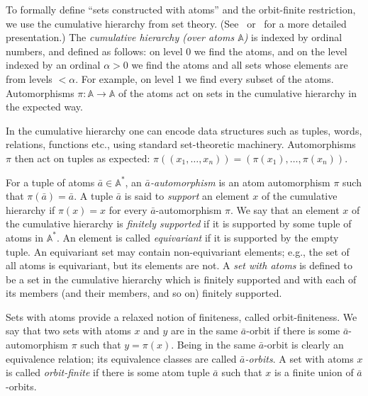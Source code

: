 \documentclass[10pt,a4paper]{amsart}
\numberwithin{equation}{section}
\newcommand{\atoms}{\mathbb A}
\begin{document}
 To formally define ``sets constructed with atoms'' and the orbit-finite restriction, we use the cumulative hierarchy from set theory. (See~\cite[Sec.~3.1]{bojanczyk_slightly2018} or~\cite[Sec.~2.6]{pitts} for a more detailed presentation.)
The \emph{cumulative hierarchy (over atoms $\atoms$)}  is indexed by ordinal numbers, and defined as follows: on level 0 we find the atoms, and on the level indexed by an ordinal $\alpha>0$ we find the atoms and all sets whose elements are from levels $< \alpha$. For example, on level 1 we find every subset of the atoms.  Automorphisms $\pi : \atoms \to \atoms$ of the atoms act on sets in the cumulative hierarchy in the expected way. 

In the cumulative hierarchy one can encode data structures such as tuples, words, relations, functions etc., using standard set-theoretic machinery.
Automorphisms $\pi$ then act on tuples as expected: $\pi((x_1, \ldots, x_n)) = (\pi(x_1), \ldots, \pi(x_n))$.

For a tuple of atoms $\bar a \in \atoms^*$, an {\em $\bar a$-automorphism} is an atom automorphism $\pi$ such that $\pi(\bar a)=\bar a$. A tuple $\bar a$ is said to \emph{support} an element $x$ of the cumulative hierarchy if
$\pi(x) = x$ for every $\bar a$-automorphism $\pi$.
    We say that an element $x$ of the cumulative hierarchy is \emph{finitely supported} if it is supported by some tuple of atoms in $\atoms^*$. An element is called {\em equivariant} if it is supported by the empty tuple. An equivariant set may contain non-equivariant elements; e.g., the set of all atoms is equivariant, but its elements are not. 
    A \emph{set with atoms} is defined to be a set in the cumulative hierarchy which is finitely supported and with each of its members (and their members, and so on) finitely supported.

Sets with atoms provide a relaxed notion of finiteness, called orbit-finiteness.
We say that two sets with atoms $x$ and $y$ are in the same $\bar a$-orbit if there is some $\bar a$-automorphism $\pi$ such that $y = \pi(x)$. 
Being in the same $\bar a$-orbit is clearly an equivalence relation; its equivalence classes are called {\em $\bar a$-orbits}. A set with atoms $x$ is called \emph{orbit-finite} if there is some atom tuple $\bar a$ such that $x$ is a finite union of $\bar a$-orbits.
\end{document}
